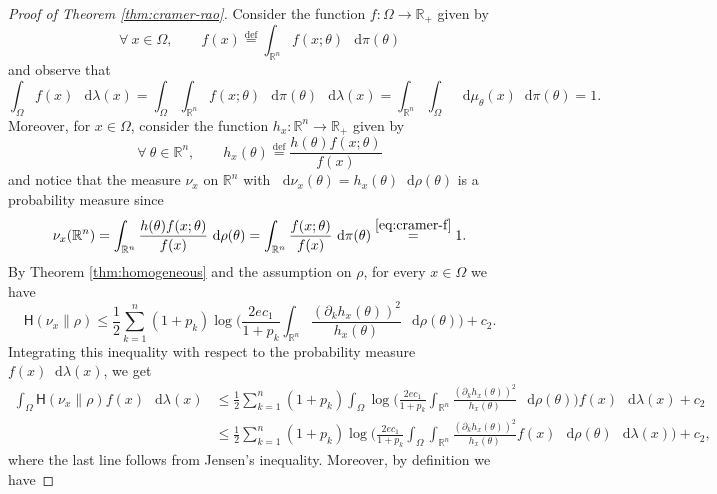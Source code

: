 \documentclass[10pt,a4paper]{amsart}
\newcommand*\diff{\mathop{}\!\mathrm{d}}
\newcommand{\HH}{\mathsf{H}}
\newcommand{\R}{\mathbb{R}} %
\newcommand{\eqdef}{\stackrel{\mathrm{def}}{=}}
\begin{document}
\begin{proof} [Proof of Theorem \ref{thm:cramer-rao}]
Consider the function $f:\Omega\to\R_+$ given by
\begin{equation} \label{eq:cramer-f}
\forall \ x\in\Omega,\qquad f(x)\eqdef \int_{\R^n} f(x;\theta) \,\diff\pi(\theta)
\end{equation}
and observe that
\begin{equation}
\int_\Omega f(x)\,\diff\lambda(x) = \int_\Omega \int_{\R^n} f(x;\theta) \,\diff\pi(\theta)\,\diff\lambda(x) = \int_{\R^n} \int_\Omega \, \diff\mu_\theta(x) \diff\pi(\theta) = 1.
\end{equation}
Moreover, for $x\in\Omega$, consider the function $h_x:\R^n\to\R_+$ given by
\begin{equation}
\forall \ \theta\in\R^n, \qquad h_x(\theta) \eqdef \frac{h(\theta)f(x;\theta)}{f(x)}
\end{equation}
and notice that the measure $\nu_x$ on $\R^n$ with $\diff\nu_x(\theta) = h_x(\theta)\diff \rho(\theta)$ is a probability measure since
\begin{equation}
\nu_x(\R^n) = \int_{\R^n} \frac{h(\theta) f(x;\theta)}{f(x)} \, \diff\rho(\theta) = \int_{\R^n} \frac{f(x;\theta)}{f(x)} \,\diff\pi(\theta)  \stackrel{\eqref{eq:cramer-f}}{=}1.
\end{equation}
By Theorem \ref{thm:homogeneous} and the assumption on $\rho$, for every $x\in\Omega$ we have
\begin{equation}
\HH(\nu_x\|\rho) \leq \frac{1}{2} \sum_{k=1}^n (1+p_k)\log\Big( \frac{2ec_1}{1+p_k} \int_{\R^n} \frac{(\partial_k h_x(\theta))^2}{h_x(\theta)}\,\diff\rho(\theta)\Big) + c_2.
\end{equation}
Integrating this inequality with respect to the probability measure $f(x)\diff\lambda(x)$, we get
\begin{equation} \label{eq:rao-long}
\begin{split}
\int_\Omega \HH(\nu_x\|\rho)f(x) \,\diff\lambda(x) & \leq \frac{1}{2} \sum_{k=1}^n (1+p_k) \int_\Omega\log\Big( \frac{2ec_1}{1+p_k} \int_{\R^n} \frac{(\partial_k h_x(\theta))^2}{h_x(\theta)}\,\diff\rho(\theta)\Big)f(x)\,\diff\lambda(x) + c_2
\\ & \leq \frac{1}{2} \sum_{k=1}^n (1+p_k) \log\Big( \frac{2ec_1}{1+p_k} \int_\Omega \int_{\R^n} \frac{(\partial_k h_x(\theta))^2}{h_x(\theta)}f(x) \,\diff\rho(\theta)\,\diff\lambda(x)\Big) + c_2,
\end{split}
\end{equation}
where the last line follows from Jensen's inequality. Moreover, by definition we have

\end{proof}
\end{document}
